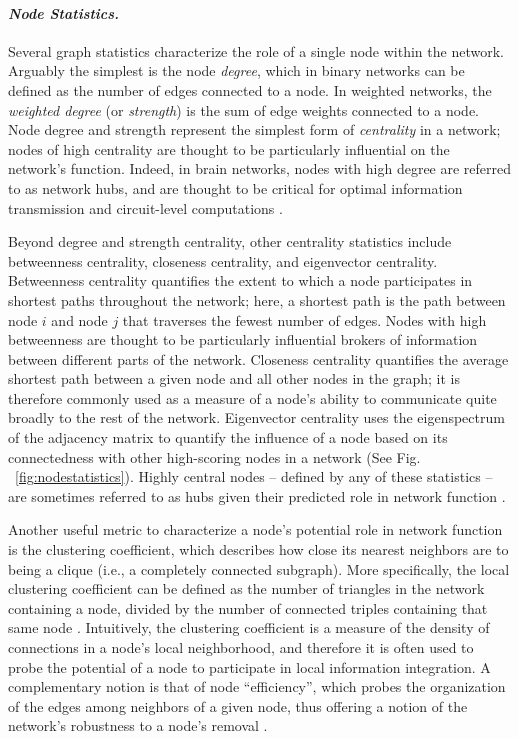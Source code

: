 \documentclass[12pt]{article}
\begin{document}
\paragraph{\emph{Node Statistics.}}

Several graph statistics characterize the role of a single node within the network. Arguably the simplest is the node \emph{degree}, which in binary networks can be defined as the number of edges connected to a node. In weighted networks, the \emph{weighted degree} (or \emph{strength}) is the sum of edge weights connected to a node. Node degree and strength represent the simplest form of \emph{centrality} in a network; nodes of high centrality are thought to be particularly influential on the network's function. Indeed, in brain networks, nodes with high degree are referred to as network hubs, and are thought to be critical for optimal information transmission and circuit-level computations \cite{sporns2010networks,betzel2016optimally}.

Beyond degree and strength centrality, other centrality statistics include betweenness centrality, closeness centrality, and eigenvector centrality. Betweenness centrality quantifies the extent to which a node participates in shortest paths throughout the network; here, a shortest path is the path between node $i$ and node $j$ that traverses the fewest number of edges. Nodes with high betweenness are thought to be particularly influential brokers of information between different parts of the network. Closeness centrality quantifies the average shortest path between a given node and all other nodes in the graph; it is therefore commonly used as a measure of a node's ability to communicate quite broadly to the rest of the network. Eigenvector centrality uses the eigenspectrum of the adjacency matrix to quantify the influence of a node based on its connectedness with other high-scoring nodes in a network (See Fig. ~\ref{fig:nodestatistics}). Highly central nodes -- defined by any of these statistics -- are sometimes referred to as hubs given their predicted role in network function \cite{sporns2007identification}. 

Another useful metric to characterize a node's potential role in network function is the clustering coefficient, which describes how close its nearest neighbors are to being a clique (i.e., a completely connected subgraph). More specifically, the local clustering coefficient can be defined as the number of triangles in the network containing a node, divided by the number of connected triples containing that same node \cite{onnela2005intensity}. Intuitively, the clustering coefficient is a measure of the density of connections in a node's local neighborhood, and therefore it is often used to probe the potential of a node to participate in local information integration. A complementary notion is that of node ``efficiency'', which probes the organization of the edges among neighbors of a given node, thus offering a notion of the network's robustness to a node's removal \cite{latora2001efficient}.
\end{document}
